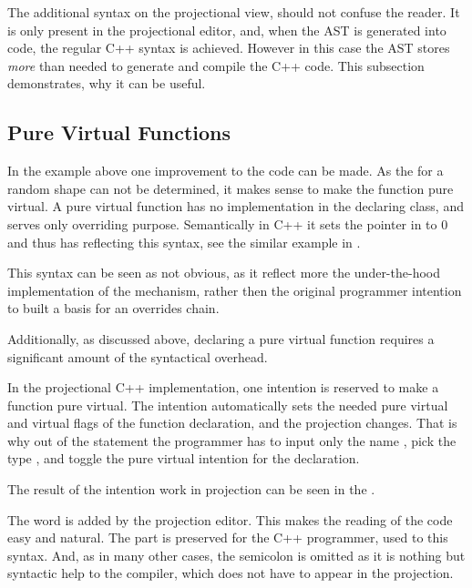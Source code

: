 
The additional syntax on the projectional view, should not confuse the reader. It is only 
present in the projectional editor, and, when the AST is generated into code, the regular
C++ syntax is achieved. However in this case the AST stores \emph{more} than needed to 
generate and compile the C++ code. This subsection demonstrates, why it can be useful.



\subsection{Pure Virtual Functions}

In the example above one improvement to the code can be made. As the  for a random shape can not 
be determined, it makes sense to make the  function pure virtual. A pure virtual function has no 
implementation in the declaring class, and serves only overriding purpose. Semantically in C++ it sets the 
pointer in  to 0 and thus has reflecting this syntax, see the similar example in .

This syntax can be seen as not obvious, as it reflect more the under-the-hood implementation of the mechanism,
rather then the original programmer intention to built a basis for an overrides chain. 

Additionally, as discussed above, declaring a pure virtual function requires a significant amount of the syntactical
overhead.

In the projectional C++ implementation, one intention is reserved to make a function pure virtual. The intention automatically
sets the needed pure virtual and virtual flags of the function declaration, and the projection changes. That is why out of the 
statement  the programmer has to input only the name , pick the type , and
toggle the pure virtual intention for the declaration. 

The result of the intention work in projection can be seen in the .


The word  is added by the projection editor. This makes the reading of the code easy and natural.
The  part is preserved for the C++ programmer, used to this syntax. And, as in many other cases, 
the semicolon is omitted as it is nothing but syntactic help to the compiler, which does not have to appear 
in the projection.

